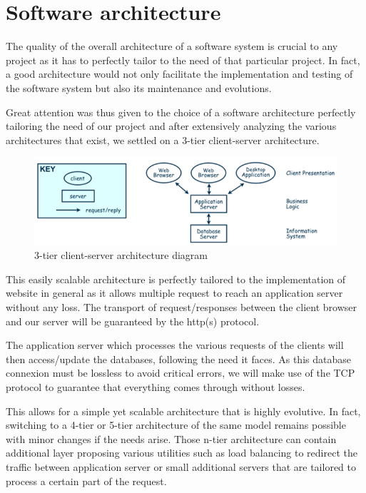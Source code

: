 \section{Software architecture}

The quality of the overall architecture of a software system is crucial to
any project as it has to perfectly tailor to the need of that particular
project. In fact, a good architecture would not only facilitate the
implementation and testing of the software system but also its maintenance
and evolutions.\newline

Great attention was thus given to the choice of a software architecture
perfectly tailoring the need of our project and after extensively analyzing
the various architectures that exist, we settled on a 3-tier client-server
architecture. \newline

\begin{figure}[H]
	\centering
	\includegraphics[width=0.8\linewidth]{ClientServerArchitecture.png}
	\caption{3-tier client-server architecture diagram}
    \label{djangoclientserver}
\end{figure}

This easily scalable architecture is perfectly tailored to the
implementation of website in general as it allows multiple request to reach
an application server without any loss. The transport of request/responses
between the client browser and our server will be guaranteed by the http(s)
protocol. \newline

The application server which processes the various requests of the clients
will then access/update the databases, following the need it faces. As this
database connexion must be lossless to avoid critical errors, we will make
use of the TCP protocol to guarantee that everything comes through without
losses. \newline

This allows for a simple yet scalable architecture that is highly evolutive.
In fact, switching to a 4-tier or 5-tier architecture of the same model
remains possible with minor changes if the needs arise. Those n-tier
architecture can contain additional layer proposing various utilities such
as load balancing to redirect the traffic between application server or
small additional servers that are tailored to process a certain part of the
request. \newline

